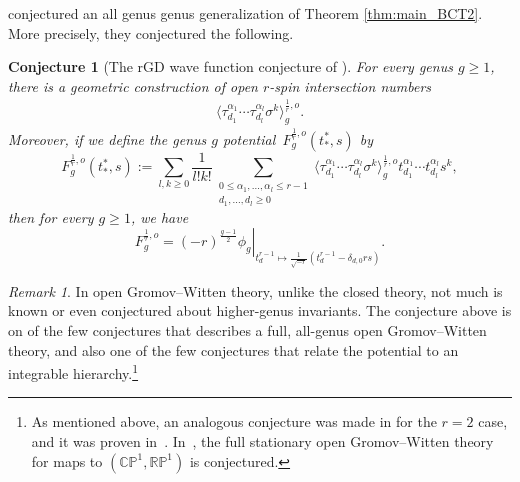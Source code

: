 \documentclass[11pt]{amsart}
\newtheorem{conj}{Conjecture}
\theoremstyle{definition}
\theoremstyle{remark}
\newtheorem{rmk}[dummy]{Remark}
\renewcommand{\d}{\ensuremath{\partial}}
\newcommand{\<}{\left<}
\renewcommand{\>}{\right>}
\numberwithin{equation}{section}
\begin{document}
\cite{BCT3} conjectured an  all genus genus generalization of Theorem \ref{thm:main_BCT2}. More precisely, they conjectured the following. 
\begin{conj}[The rGD wave function conjecture of \cite{BCT3}]\label{conj:main_conj_BCT}
For every genus $g\geq 1$, there is a geometric construction of open $r$-spin intersection numbers
\begin{gather}\label{eq:open_numbers_all_g}
\langle\tau^{\alpha_1}_{d_1}\cdots\tau^{\alpha_l}_{d_l}\sigma^k\rangle^{\frac{1}{r},o}_g.
\end{gather}
Moreover, if we define the genus $g$ potential~$F_g^{\frac{1}{r},o}(t^*_*,s)$ %
by
\begin{equation}\label{eq:g_pot}
F_g^{\frac{1}{r},o}(t^*_*,s):=\sum_{l,k\ge 0}\frac{1}{l!k!}\sum_{\substack{0\le\alpha_1,\ldots,\alpha_l\le r-1\\d_1,\ldots,d_l\ge 0}}\langle\tau^{\alpha_1}_{d_1}\cdots\tau^{\alpha_l}_{d_l}\sigma^k\rangle^{\frac{1}{r},o}_g t^{\alpha_1}_{d_1}\cdots t^{\alpha_l}_{d_l}s^k,
\end{equation}
then for %
every $g\geq 1$, we have
\begin{equation}\label{eq:bct_conj}
F^{\frac{1}{r},o}_g=\left.(-r)^{\frac{g-1}{2}}\phi_g\right|_{t^{r-1}_d\mapsto\frac{1}{\sqrt{-r}}(t^{r-1}_d-\delta_{d,0}rs)}.
\end{equation}
\end{conj}
\begin{rmk}
In open Gromov--Witten theory, unlike the closed theory, not much is known or even conjectured about higher-genus invariants. The conjecture above is on of the few conjectures that describes a full, all-genus open Gromov--Witten theory, and also one of the few conjectures that relate the potential to an integrable hierarchy.\footnote{%
As mentioned above, an %
analogous conjecture was made in \cite{PST14} for the $r=2$ case, and it was proven in~\cite{BT17}. In~\cite{BPTZ}, the full stationary open Gromov--Witten theory for maps to $(\mathbb{CP}^1,\mathbb{RP}^1)$ is conjectured.}
\end{rmk}
\end{document}

